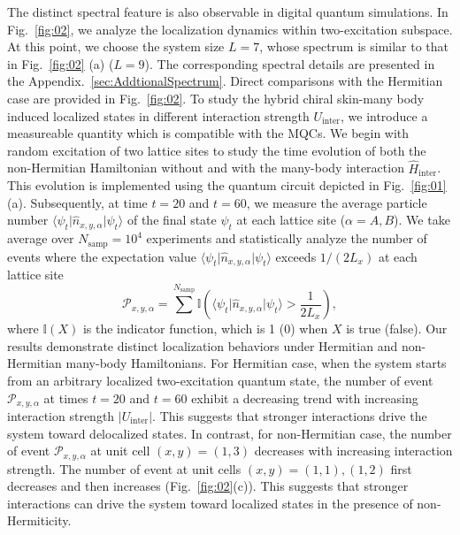 \documentclass[longbibliography, aps, prx, amsmath, amssymb, amsfonts, twocolumn,superscriptaddress, footinbib]{revtex4-1}
\begin{document}
	The distinct spectral feature is also observable in digital quantum simulations. In Fig.~\ref{fig:02}, we analyze the localization dynamics within two-excitation subspace. At this point, we choose the system size $L=7$, whose spectrum is similar to that in Fig.~\ref{fig:02} (a) ($L=9$). The corresponding spectral details are presented in the Appendix.~\ref{sec:AddtionalSpectrum}. Direct comparisons with the Hermitian case are provided in Fig.~\ref{fig:02}.
	To study the hybrid chiral skin-many body induced localized states in different interaction strength $U_{\text{inter}}$, we introduce a measureable quantity which is compatible with the MQCs. %
	We begin with random excitation of two lattice sites to
	study the time evolution of both the non-Hermitian Hamiltonian without and with the many-body interaction $\hat{H}_{\text{inter}}$. This evolution is implemented using the quantum circuit depicted in Fig.~\ref{fig:01}(a). Subsequently, at time $t=20$ and $t=60$, we measure the average particle number $\langle \psi_{t} \vert \hat{n}_{x,y,\alpha} \vert \psi_t \rangle$ of the final state $\psi_t$ at each lattice site ($\alpha=A,B$). We take average over $N_{\text{samp}}=10^4$ experiments and statistically analyze the number of events where the expectation value $\langle \psi_{t} \vert \hat{n}_{x,y,\alpha} \vert \psi_t \rangle$ exceeds $1/(2L_x)$ at each lattice site
	\begin{equation}
		\mathcal{P}_{{x}, {y}, {\alpha}} = \sum^{N_{\text{samp}}} \mathbb{I}(\langle \psi_{t} \vert \hat{n}_{x,y,\alpha} \vert \psi_t \rangle > \frac{1}{2L_x}), \label{eq:NumbEvent}
	\end{equation}
	where $\mathbb{I}(X)$ is the indicator function, which is 1 (0) when $X$ is true (false).%
	Our results demonstrate distinct localization behaviors under Hermitian and non-Hermitian many-body Hamiltonians. For Hermitian case, when the system starts from an arbitrary localized two-excitation quantum state, the number of event $\mathcal{P}_{x,y,\alpha}$ at times $t=20$ and $t=60$ exhibit a decreasing trend with increasing interaction strength $\vert U_{\text{inter}} \vert$. This suggests that stronger interactions drive the system toward delocalized states.
	In contrast, for non-Hermitian case, the number of event $\mathcal{P}_{x,y,\alpha}$ at unit cell $(x,y)=(1,3)$ decreases with increasing interaction strength. The number of event at unit cells $(x,y)=(1,1),(1,2)$ first decreases and then increases (Fig.~\ref{fig:02}(c)). This suggests that stronger interactions can drive the system toward localized states in the presence of non-Hermiticity.
\end{document}
